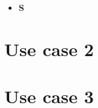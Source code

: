     \begin{itemize}
        \item \textbf{S}
    \end{itemize}
    \section{Use case 2}

    \section{Use case 3}

